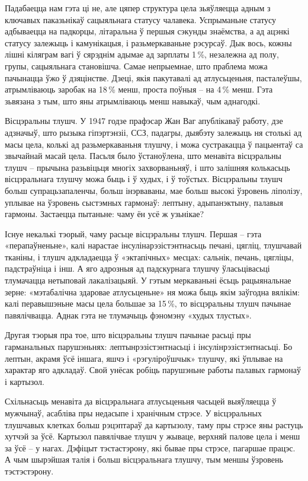 Падабаецца нам гэта ці не, але цяпер структура цела зьяўляецца адным з ключавых паказьнікаў сацыяльнага статусу чалавека. Успрыманьне статусу адбываецца на падкорцы, літаральна ў першыя сэкунды знаёмства, а ад ацэнкі статусу залежыць і камунікацыя, і разьмеркаваньне рэсурсаў. Дык вось, кожны лішні кіляграм вагі ў сярэднім адымае ад зарплаты 1\,\%, незалежна ад полу, групы, сацыяльнага становішча. Самае непрыемнае, што праблема можа пачынацца ўжо ў дзяцінстве. Дзеці, якія пакутавалі ад атлусьценьня, пасталеўшы, атрымліваюць заробак на 18\,\% менш, проста поўныя – на 4\,\% менш. Гэта зьвязана з тым, што яны атрымліваюць менш навыкаў, чым аднагодкі.

Вісцэральны тлушч. У 1947 годзе прафэсар Жан Ваг апублікаваў работу, дзе адзначыў, што рызыка гіпэртэнзіі, ССЗ, падагры, дыябэту залежыць ня столькі ад масы цела, колькі ад разьмеркаваньня тлушчу, і можа сустракацца ў пацыентаў са звычайнай масай цела. Пасьля было ўстаноўлена, што менавіта вісцэральны тлушч – прычына разьвіцьця многіх захворваньняў, і што залішняя колькасьць вісцэральнага тлушчу можа быць і ў худых, і ў тоўстых. Вісцэральны тлушч больш супрацьзапаленчы, больш інэрваваны, мае больш высокі ўзровень ліполізу, уплывае на ўзровень сыстэмных гармонаў: лептыну, адыпанэктыну, палавыя гармоны. Застаецца пытаньне: чаму ён усё ж узьнікае?

Існуе некалькі тэорый, чаму расьце вісцэральны тлушч. Першая – гэта «перапаўненьне», калі нарастае інсулінарэзістэнтнасьць печані, цягліц, тлушчавай тканіны, і тлушч адкладаецца ў «эктапічных» месцах: сальнік, печань, цягліцы, падстраўніца і інш. А яго адрозныя ад падскурнага тлушчу ўласьцівасьці тлумачацца нетыповай лакалізацыяй. У гэтым меркаваньні ёсьць рацыянальнае зерне: «мэтабалічна здаровае атлусьценьне» ня можа быць якім заўгодна вялікім: калі перавышэньне масы цела большае за 15\,\%, то вісцэральны тлушч пачынае павялічвацца. Аднак гэта не тлумачыць фэномэну «худых тлустых».

Другая тэорыя пра тое, што вісцэральны тлушч пачынае расьці пры гарманальных парушэньнях: лептынрэзістэнтнасьці і інсулінрэзістэнтнасьці. Бо лептын, акрамя ўсё іншага, яшчэ і «рэгуліроўшчык» тлушчу, які ўплывае на характар яго адкладаў. Свой унёсак робіць парушэньне работы палавых гармонаў і картызол.

Схільнасьць менавіта да вісцэральнага атлусьценьня часьцей выяўляецца ў мужчынаў, асабліва пры недасыпе і хранічным стрэсе. У вісцэральных тлушчавых клетках больш рэцэптараў да картызолу, таму пры стрэсе яны растуць хутчэй за ўсё. Картызол павялічвае тлушч у жываце, верхняй палове цела і менш за ўсё – у нагах. Дэфіцыт тэстастэрону, які бывае пры стрэсе, пагаршае працэс. А чым шырэйшая талія і больш вісцэральнага тлушчу, тым меншы ўзровень тэстэстэрону.

